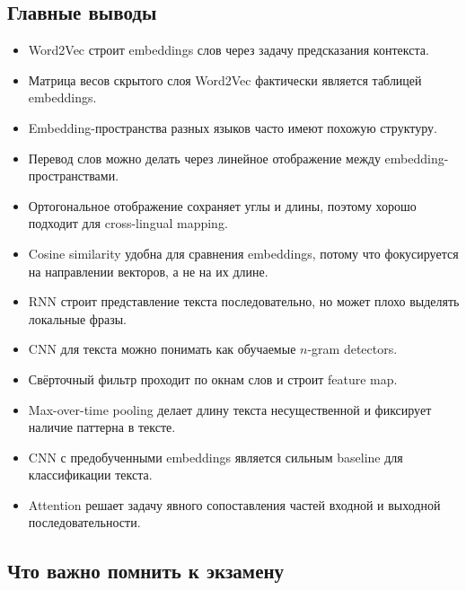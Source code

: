\documentclass[a4paper,12pt]{article}
\begin{document}
\subsection{Главные выводы}

\begin{itemize}
    \item Word2Vec строит embeddings слов через задачу предсказания контекста.
    \item Матрица весов скрытого слоя Word2Vec фактически является таблицей embeddings.
    \item Embedding-пространства разных языков часто имеют похожую структуру.
    \item Перевод слов можно делать через линейное отображение между embedding-пространствами.
    \item Ортогональное отображение сохраняет углы и длины, поэтому хорошо подходит для cross-lingual mapping.
    \item Cosine similarity удобна для сравнения embeddings, потому что фокусируется на направлении векторов, а не на их длине.
    \item RNN строит представление текста последовательно, но может плохо выделять локальные фразы.
    \item CNN для текста можно понимать как обучаемые \(n\)-gram detectors.
    \item Свёрточный фильтр проходит по окнам слов и строит feature map.
    \item Max-over-time pooling делает длину текста несущественной и фиксирует наличие паттерна в тексте.
    \item CNN с предобученными embeddings является сильным baseline для классификации текста.
    \item Attention решает задачу явного сопоставления частей входной и выходной последовательности.
\end{itemize}

\subsection{Что важно помнить к экзамену}
\end{document}
